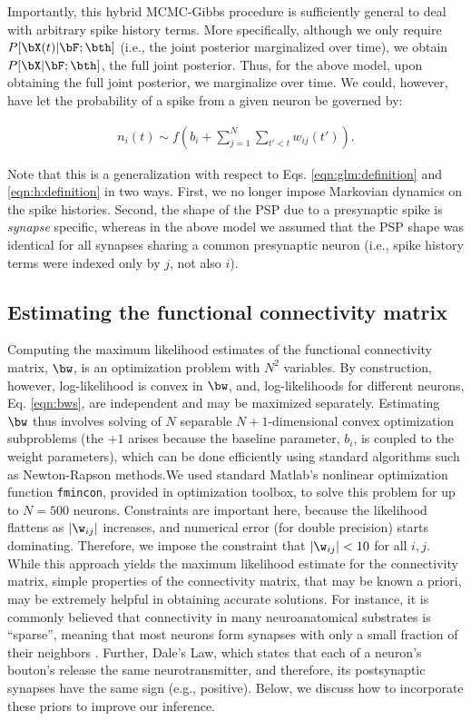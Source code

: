 Importantly, this hybrid MCMC-Gibbs procedure is sufficiently general to deal with arbitrary spike history terms.  More specifically, although we only require $P[\bX(t) | \bF; \bth]$ (i.e., the joint posterior marginalized over time), we obtain $P[\bX | \bF; \bth]$, the full joint posterior.  Thus, for the above model, upon obtaining the full joint posterior, we marginalize over time.  We could, however, have let the probability of a spike from a given neuron be governed by:

\begin{align}
n_i(t) \sim f(b_i+\sum_{j=1}^{N}\sum_{t'<t} w_{ij}(t')).
\end{align}

\noindent Note that this is a generalization with respect to Eqs. \eqref{eqn:glm:definition} and \eqref{eqn:h:definition} in two ways.  First, we no longer impose Markovian dynamics on the spike histories.  Second, the shape of the PSP due to a presynaptic spike is \emph{synapse} specific, whereas in the above model we assumed that the PSP shape was identical for all synapses sharing a common presynaptic neuron (i.e., spike history terms were indexed only by $j$, not also $i$).  

\subsection{Estimating the functional connectivity matrix} \label{sec:methods:parameters HMM}

Computing the maximum likelihood estimates of the functional connectivity matrix, $\bw$, is an optimization problem with $N^2$ variables. By construction, however, log-likelihood is convex in $\bw$, and, log-likelihoods for different neurons, Eq. \eqref{eqn:bws}, are independent and may be maximized separately. Estimating $\bw$ thus involves solving of $N$ separable $N+1$-dimensional convex optimization subproblems (the $+1$ arises because the baseline parameter, $b_i$, is coupled to the weight parameters), which can be done efficiently using standard algorithms such as Newton-Rapson methods.We used standard Matlab's nonlinear optimization function \texttt{fmincon}, provided in optimization toolbox, to solve this problem for up to $N=500$ neurons.  Constraints are important here, because the likelihood flattens as $|\w_{ij}|$ increases, and numerical error (for double precision) starts dominating.  Therefore, we impose the constraint that $|\w_{ij}|<10$ for all $i,j$. While this approach yields the maximum likelihood estimate for the connectivity matrix, simple properties of the connectivity matrix, that may be known a priori, may be extremely helpful in obtaining accurate solutions. For instance, it is commonly believed that connectivity in many neuroanatomical substrates is ``sparse'', meaning that most neurons form synapses with only a small fraction of their neighbors \cite{??}.  Further, Dale's Law, which states that each of a neuron's bouton's release the same neurotransmitter, and therefore, its postsynaptic synapses have the same sign (e.g., positive).  Below, we discuss how to incorporate these priors to improve our inference.

